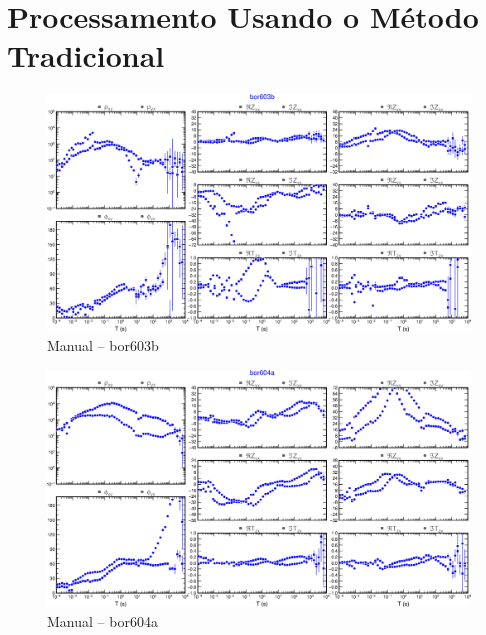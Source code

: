 \chapter{Processamento Usando o Método Tradicional}
\label{ap-trad}
    \begin{figure}[H]
        \caption{Manual -- bor603b}
            \begin{center}
                \includegraphics[width=15cm]{texto/figura/sites/M-bor603b.png}
            \end{center}
    \end{figure}
    \begin{figure}[H]
        \caption{Manual -- bor604a}
            \begin{center}
                \includegraphics[width=15cm]{texto/figura/sites/M-bor604a.png}
            \end{center}
    \end{figure}
    
